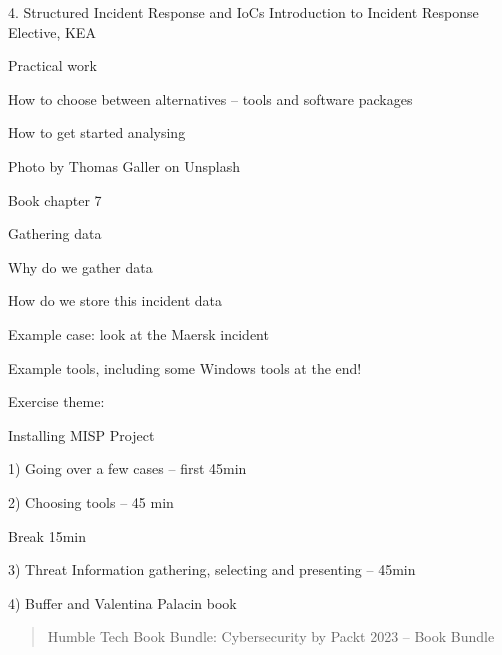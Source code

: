 \documentclass[Screen16to9,17pt]{foils}
\begin{document}
\mytitlepage
{4. Structured Incident Response and IoCs}
{Introduction to Incident Response Elective, KEA}




\begin{list2}
\item Practical work
\item How to choose between alternatives -- tools and software packages
\item How to get started analysing
\end{list2}

{\hfill \small Photo by Thomas Galler on Unsplash}


\begin{list2}
\item Book chapter 7
\item Gathering data
\item Why do we gather data
\item How do we store this incident data
\item Example case: look at the Maersk incident
\item Example tools, including some Windows tools at the end!
\end{list2}

Exercise theme:
\begin{list2}
\item Installing MISP Project
\end{list2}


\begin{list2}
\item 1) Going over a few cases -- first 45min
\item 2) Choosing tools -- 45 min
\item Break 15min
\item 3) Threat Information gathering, selecting and presenting -- 45min
\item 4) Buffer and Valentina Palacin book
\end{list2}




\begin{quote}
Humble Tech Book Bundle: Cybersecurity by Packt 2023 -- Book Bundle
\end{quote}
\end{document}
